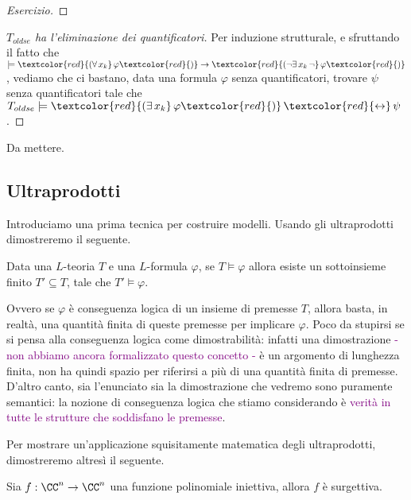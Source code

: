 \begin{proof}
    [Esercizio]
\end{proof}

\begin{proof}
    [$T_{oldse}$ ha l'eliminazione dei quantificatori]
    Per induzione strutturale, e sfruttando il fatto che $\models \textcolor{red}{(\forall\,x_k}\, \varphi\textcolor{red}{)} \to \textcolor{red}{(\neg\exists\,x_k\,\neg}\,\varphi\textcolor{red}{)}$,
    vediamo che ci bastano, data una formula $\varphi$ senza quantificatori, trovare $\psi$ senza quantificatori tale che $T_{oldse} \models \textcolor{red}{(\exists\,x_k}\, \varphi\textcolor{red}{)} \,\textcolor{red}{\leftrightarrow}\, \psi$.
\end{proof}

\begin{exercise}
 Da mettere.
\end{exercise}

\subsection{Ultraprodotti}
Introduciamo una prima tecnica per costruire modelli. Usando gli ultraprodotti dimostreremo il seguente.

\begin{theorem}
    Data una $L$-teoria $T$ e una $L$-formula $\varphi$, se $T \models \varphi$ allora esiste un sottoinsieme finito $T' \subseteq T$,
    tale che $T' \models \varphi$.
\end{theorem}

Ovvero se $\varphi$ è conseguenza logica di un insieme di premesse $T$, allora basta, in realtà, una quantità finita di queste premesse per implicare $\varphi$.
Poco da stupirsi se si pensa alla conseguenza logica come dimostrabilità: infatti una dimostrazione \textcolor{purple}{- non abbiamo ancora formalizzato questo concetto -} è 
un argomento di lunghezza finita, non ha quindi spazio per riferirsi a più di una quantità finita di premesse. D'altro canto, sia l'enunciato sia la dimostrazione che vedremo sono puramente semantici:
la nozione di conseguenza logica che stiamo considerando è \textcolor{purple}{verità in tutte le strutture che soddisfano le premesse}.

Per mostrare un'applicazione squisitamente matematica degli ultraprodotti, dimostreremo altresì il seguente.

\begin{theorem}
    [Ax-Grothendieck]
    Sia $f : \CC^n \to \CC^n$ una funzione polinomiale iniettiva, allora $f$ è surgettiva.
\end{theorem}

